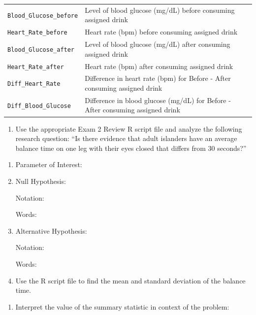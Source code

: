 \documentclass[
]{report}
\providecommand{\tightlist}{%
  \setlength{\itemsep}{0pt}\setlength{\parskip}{0pt}}
\begin{document}
{\begin{longtable}[]{@{}
  >{\raggedright\arraybackslash}p{}
  >{\raggedright\arraybackslash}p{}@{}}
\texttt{Blood\_Glucose\_before} & Level of blood glucose (mg/dL) before consuming assigned drink \\
\texttt{Heart\_Rate\_before} & Heart rate (bpm) before consuming assigned drink \\
\texttt{Blood\_Glucose\_after} & Level of blood glucose (mg/dL) after consuming assigned drink \\
\texttt{Heart\_Rate\_after} & Heart rate (bpm) after consuming assigned drink \\
\texttt{Diff\_Heart\_Rate} & Difference in heart rate (bpm) for Before - After consuming assigned drink \\
\texttt{Diff\_Blood\_Glucose} & Difference in blood glucose (mg/dL) for Before - After consuming assigned drink \\
\end{longtable}
}

\begin{enumerate}
\def\labelenumi{\arabic{enumi}.}
\tightlist
\item
  Use the appropriate Exam 2 Review R script file and analyze the following research question: ``Is there evidence that adult islanders have an average balance time on one leg with their eyes closed that differs from 30 seconds?''
\end{enumerate}

\begin{enumerate}
\def\labelenumi{\alph{enumi}.}
\item
  Parameter of Interest:
  \vspace{0.3in}
\item
  Null Hypothesis:

  Notation:
  \vspace{0.3in}

  Words:
  \vspace{0.5in}
\item
  Alternative Hypothesis:

  Notation:
  \vspace{0.3in}

  Words:
  \vspace{0.5in}
\item
  Use the R script file to find the mean and standard deviation of the balance time.
\end{enumerate}

\vspace{0.3in}

\begin{enumerate}
\def\labelenumi{\alph{enumi}.}
\setcounter{enumi}{4}
\tightlist
\item
  Interpret the value of the summary statistic in context of the problem:
\end{enumerate}
\end{document}

